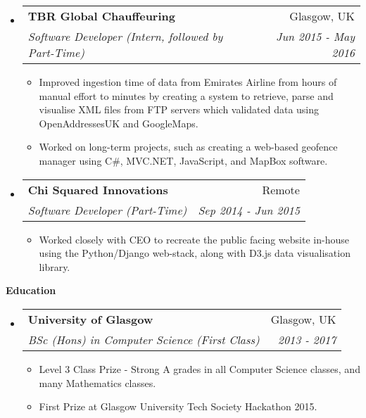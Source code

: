\documentclass[letterpaper,11pt]{article}
\makeatletter
\newcommand{\resitem}[1]{\item #1 \vspace{-2pt}}
\newcommand{\resheading}[1]{{\large \colorbox{mygrey}{\begin{minipage}{\textwidth}{\textbf{#1 \vphantom{p\^{E}}}}\end{minipage}}}}
\newcommand{\ressubheading}[4]{
\begin{tabular*}{7.0in}{l@{\extracolsep{\fill}}r}
	\textbf{#1} & #2 \\
	\textit{#3} & \textit{#4} \\
\end{tabular*}\vspace{-6pt}}
\makeatother
\begin{document}
\begin{itemize}
		\item
		\ressubheading{TBR Global Chauffeuring}{Glasgow, UK}{Software Developer (Intern, followed by Part-Time)}{Jun 2015 - May 2016}
		\begin{itemize}
			\resitem{Improved ingestion time of data from Emirates Airline from hours of manual effort to minutes by creating a system to retrieve, parse and visualise XML files from FTP servers which validated data using OpenAddressesUK and GoogleMaps.}
			\resitem{Worked on long-term projects, such as creating a web-based geofence manager using C\#, MVC.NET, JavaScript, and MapBox software.}
		\end{itemize}

		\item
		\ressubheading{Chi Squared Innovations}{Remote}{Software Developer (Part-Time)}{Sep 2014 - Jun 2015}
		\begin{itemize}
			\resitem {Worked closely with CEO to recreate the public facing website in-house using the Python/Django web-stack, along with D3.js data visualisation library.}
		\end{itemize}

	\end{itemize}
	
	\resheading{Education}
	\begin{itemize}
		\item
		\ressubheading{University of Glasgow}{Glasgow, UK}{BSc (Hons) in Computer Science (First Class)}{2013 - 2017}
		\begin{itemize}
			\resitem{Level 3 Class Prize - Strong A grades in all Computer Science classes, and many Mathematics classes.}
			\resitem{First Prize at Glasgow University Tech Society Hackathon 2015.}
		\end{itemize}
	\end{itemize}
\end{document}
